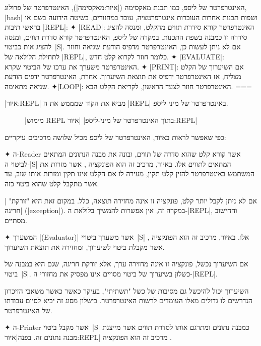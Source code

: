 \begin{minipage}{0.9\linewidth}
  \centering
  \footnotesize
\begin{mdframed}[backgroundcolor=Lavender!20]
    האינטרפרטר של ליספ, כמו תכנת מאקסימה (|איור:מאקסימה|), האינטרפרטר של
    פרולוג, \E|bash| ושפות תכנות אחרות העוברות אינטרפרטציה, עובד במחזורים,
    בשיטה הידועה בשם
    או בראשי תיבות \E|REPL|:
    ✦ \E|READ|: האינטרפרטר קורא סידרת תווים מהקלט, ומנסה להציג סידרה זו כמבנה
    בשפת התכנות. במקרה של ליספ, האינטרפרטר קורא סדרת תווים, ומנסה להציג
    אות כביטוי~\E|S|. אם לא ניתן לעשות כן, האינטרפרטר מדפיס הודעת שגיאה וחוזר
    לתחילת הלולאה של \E|REPL|, כלומר חוזר לקרוא קלט חדש.
    ✦ \E|EVALUATE|: האינטרפרטר משערך את ערכו של הביטוי שקרא.
    ✦ \E|PRINT|: אם השיערוך של הקלט מצליח, אז האינטרפרטר ידפיס את תוצאת
    השיערוך. אחרת, האינטרפרטר ידפיס הודעת שגיאה מתאימה.
    ✦\E|LOOP|: האינטרפרטר חוזר לצעד הראשון, לקריאת הקלט הבא.
===
  \end{mdframed}
\end{minipage}

|איור:REPL| מביא את הקוד שמממש את ה-\E|REPL| באינטרפרטר של מיני-ליספ.
\begin{figure}[H]
|מימוש REPL בתוך האינטרפרטר של מיני-ליספ|
|איור:REPL|
\begin{LTR}
  \def\codesize{\small}
  
\end{LTR}
\end{figure}

כפי שאפשר לראות באיור, האינטרפרטר של ליספ מכיל שלושה מרכיבים עיקריים:
\begin{enumerate}

  ✦ ה-Reader אשר קורא קלט שהוא סדרה של תווים, ובונה את מבנה הנתונים המתאים
  לביטוי ה-\E|S| המתאים לתווים אלו. באיור, מרכיב זה הוא הפונקציה ,
  אשר מזרזת את המשתמש באינטרפרטר להזין קלט תקין, מעירה לו אם הקלט אינו תקין
  ומזרזת אותו שוב, עד אשר מתקבל קלט שהוא ביטוי כזה.

  אם לא ניתן לקבל יותר קלט, פונקציה זו אינה מחזירה תוצאה, כלל. במקום זאת היא
  "זורקת" \ע|חריגה| (\E|exception|). במקרה זה, אין אפשרות להמשיך בלולאת
  ה-\E|REPL|, והחישוב מסתיים.

  ✦ המשערך \E|(Evaluator)| אשר משערך ביטויי~\E|S| אלו. באיור, מרכיב זה הוא
  הפונקציה , אשר מקבלת ביטוי לשיערוך, ומחזירה את תוצאת השיערוך.

  אם השיערוך נכשל, פונקציה זו אינה מחזירה ערך, אלא זורקת חריגה, שגם היא במבנה
  של ביטוי~\E|S|. כשלון בשיערוך של ביטוי מסויים אינו מפסיק את מחזורי
  ה-\E|REPL|.

  השיערוך יכול להיכשל גם מסיבות של כשל "תשתיתי", בעיקר כאשר כאשר משאבי הזיכרון
  הנדרשים לו גדולים מאלו העומדים לרשות האינטרפרטר. כישלון מסוג זה יביא לסיום עבודתו
  של האינטרפרטר.

  ✦ ה-Printer אשר מקבל ביטוי~\E|S| כמבנה נתונים ומתרגם אותו לסדרת תווים אשר
  מייצגת מבנה נתונים זה. בפנה|איור:REPL| מרכיב זה הוא הפונקציה .
\end{enumerate}

